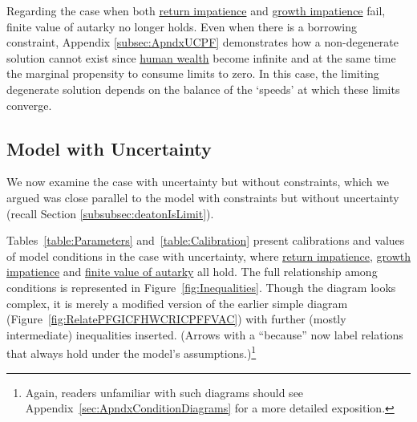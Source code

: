 \documentclass[BufferStockTheory]{subfiles}
\begin{document}
\begin{comment}
For future work (Akshay):

The consumer's patience in the continuation value remains finite, as the planning horizon recedes, the consumer will never take consumption to zero due to excessive patience.
\end{comment}



Regarding the case when both  \hyperlink{RIC}{return impatience}  and \hyperlink{GICRaw}{growth impatience} fail, \hypertarget{PFFVAC}{finite value of autarky} no longer holds. Even when there is a borrowing constraint, Appendix \ref{subsec:ApndxUCPF} demonstrates how a non-degenerate solution cannot exist since \hyperlink{FHWC}{human wealth} become infinite and at the same time the marginal propensity to consume limits to zero. In this case, the limiting degenerate solution depends on the balance of the `speeds' at which these limits converge. 

\hypertarget{TheModelUncertainty}{}
\subsection{Model with Uncertainty}\label{subsec:TheModelUncertainty}

We now examine the case with uncertainty but without constraints, which we argued was close parallel to the model with constraints but without uncertainty (recall Section \ref{subsubsec:deatonIsLimit}).
\hypertarget{Calibration}{}


\hypertarget{Symbols}{}




Tables~\ref{table:Parameters} and~\ref{table:Calibration} present calibrations and values of model conditions in the case with uncertainty, where \hyperlink{RIC}{return impatience}, \hyperlink{GICRaw}{growth impatience} and \hyperlink{FVAC}{finite value of autarky} all hold.  The full relationship among conditions is represented in Figure~\ref{fig:Inequalities}.  Though the diagram looks complex, it is merely a modified version of the earlier simple diagram (Figure~\ref{fig:RelatePFGICFHWCRICPFFVAC}) with further (mostly intermediate) inequalities inserted.  (Arrows with a ``because'' now label relations that always hold under the model's assumptions.)\footnote{Again, readers unfamiliar with such diagrams should see Appendix~\ref{sec:ApndxConditionDiagrams} for a more detailed exposition.}
\end{document}
